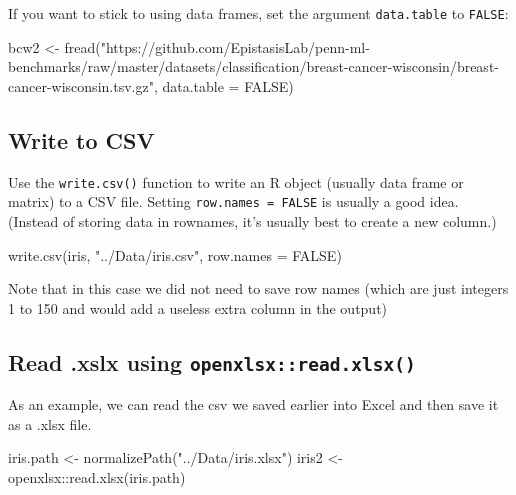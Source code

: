 \documentclass[
]{book}
\newenvironment{Shaded}{\begin{snugshade}}{\end{snugshade}}
\newcommand{\AttributeTok}[1]{\textcolor[rgb]{0.77,0.63,0.00}{#1}}
\newcommand{\ConstantTok}[1]{\textcolor[rgb]{0.00,0.00,0.00}{#1}}
\newcommand{\FunctionTok}[1]{\textcolor[rgb]{0.00,0.00,0.00}{#1}}
\newcommand{\NormalTok}[1]{#1}
\newcommand{\OtherTok}[1]{\textcolor[rgb]{0.56,0.35,0.01}{#1}}
\newcommand{\SpecialCharTok}[1]{\textcolor[rgb]{0.00,0.00,0.00}{#1}}
\newcommand{\StringTok}[1]{\textcolor[rgb]{0.31,0.60,0.02}{#1}}
\begin{document}
If you want to stick to using data frames, set the argument \texttt{data.table} to \texttt{FALSE}:

\begin{Shaded}
\begin{Highlighting}[]
\NormalTok{bcw2 }\OtherTok{\textless{}{-}} \FunctionTok{fread}\NormalTok{(}\StringTok{"https://github.com/EpistasisLab/penn{-}ml{-}benchmarks/raw/master/datasets/classification/breast{-}cancer{-}wisconsin/breast{-}cancer{-}wisconsin.tsv.gz"}\NormalTok{,}
              \AttributeTok{data.table =} \ConstantTok{FALSE}\NormalTok{)}
\end{Highlighting}
\end{Shaded}

\hypertarget{write-to-csv}{%
\subsection{Write to CSV}\label{write-to-csv}}

Use the \texttt{write.csv()} function to write an R object (usually data frame or matrix) to a CSV file. Setting \texttt{row.names\ =\ FALSE} is usually a good idea. (Instead of storing data in rownames, it's usually best to create a new column.)

\begin{Shaded}
\begin{Highlighting}[]
\FunctionTok{write.csv}\NormalTok{(iris, }\StringTok{"../Data/iris.csv"}\NormalTok{, }\AttributeTok{row.names =} \ConstantTok{FALSE}\NormalTok{)}
\end{Highlighting}
\end{Shaded}

Note that in this case we did not need to save row names (which are just integers 1 to 150 and would add a useless extra column in the output)

\hypertarget{read-.xslx-using-openxlsxread.xlsx}{%
\subsection{\texorpdfstring{Read .xslx using \texttt{openxlsx::read.xlsx()}}{Read .xslx using openxlsx::read.xlsx()}}\label{read-.xslx-using-openxlsxread.xlsx}}

As an example, we can read the csv we saved earlier into Excel and then save it as a .xlsx file.

\begin{Shaded}
\begin{Highlighting}[]
\NormalTok{iris.path }\OtherTok{\textless{}{-}} \FunctionTok{normalizePath}\NormalTok{(}\StringTok{"../Data/iris.xlsx"}\NormalTok{)}
\NormalTok{iris2 }\OtherTok{\textless{}{-}}\NormalTok{ openxlsx}\SpecialCharTok{::}\FunctionTok{read.xlsx}\NormalTok{(iris.path)}
\end{Highlighting}
\end{Shaded}
\end{document}
